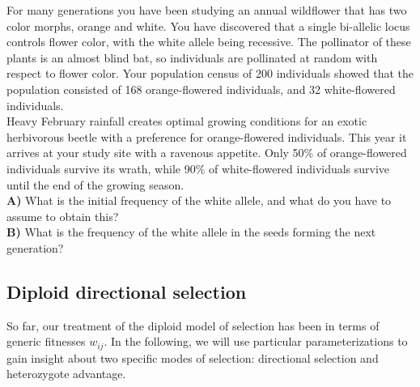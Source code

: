 \begin{question}
For many generations you have been studying an annual wildflower that has two color morphs, orange and white. You have discovered that a single bi-allelic locus controls flower color, with the white allele being recessive. The pollinator of these plants is an almost blind bat, so individuals are pollinated at random with respect to flower color. Your population census of 200 individuals showed that the population consisted of 168 orange-flowered individuals, and 32 white-flowered individuals.\\
Heavy February rainfall creates optimal growing conditions for an
exotic herbivorous beetle with a preference for orange-flowered
individuals.  This year it arrives at your study site with a ravenous
appetite.  Only 50\% of orange-flowered individuals survive its wrath,
while 90\% of white-flowered individuals survive until the end of the
growing season.  \\
{\bf A)} What is the initial frequency of the white allele, and what do you
have to assume to obtain this?\\
{\bf B)} What is the frequency of the white allele in the seeds forming the next generation?\\
\end{question}


\subsection{Diploid directional selection}
So far, our treatment of the diploid model of selection has been in terms of generic fitnesses $w_{ij}$. In the following, we will use particular parameterizations to gain insight about two specific modes of selection: directional selection and heterozygote advantage.

